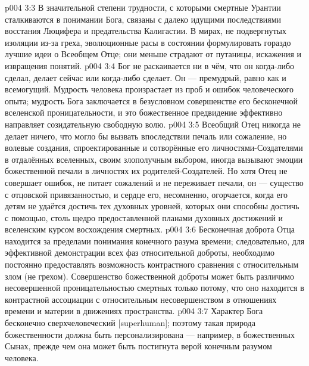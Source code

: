 \vs p004 3:3 \pc В значительной степени трудности, с которыми смертные Урантии сталкиваются в понимании Бога, связаны с далеко идущими последствиями восстания Люцифера и предательства Калигастии. В мирах, не подвергнутых изоляции из\hyp{}за греха, эволюционные расы в состоянии формулировать гораздо лучшие идеи о Всеобщем Отце; они меньше страдают от путаницы, искажения и извращения понятий.
\vs p004 3:4 \pc Бог не раскаивается ни в чём, что он когда\hyp{}либо сделал, делает сейчас или когда\hyp{}либо сделает. Он --- премудрый, равно как и всемогущий. Мудрость человека произрастает из проб и ошибок человеческого опыта; мудрость Бога заключается в безусловном совершенстве его бесконечной вселенской проницательности, и это божественное предвидение эффективно направляет созидательную свободную волю.
\vs p004 3:5 Всеобщий Отец никогда не делает ничего, что могло бы вызвать впоследствии печаль или сожаление, но волевые создания, спроектированные и сотворённые его личностями\hyp{}Создателями в отдалённых вселенных, своим злополучным выбором, иногда вызывают эмоции божественной печали в личностях их родителей\hyp{}Создателей. Но хотя Отец не совершает ошибок, не питает сожалений и не переживает печали, он --- существо с отцовской привязанностью, и сердце его, несомненно, огорчается, когда его детям не удаётся достичь тех духовных уровней, которых они способны достичь с помощью, столь щедро предоставленной планами духовных достижений и вселенским курсом восхождения смертных.
\vs p004 3:6 Бесконечная доброта Отца находится за пределами понимания конечного разума времени; следовательно, для эффективной демонстрации всех фаз относительной доброты, необходимо постоянно предоставлять возможность контрастного сравнения с относительным злом (не грехом). Совершенство божественной доброты может быть различимо несовершенной проницательностью смертных только потому, что оно находится в контрастной ассоциации с относительным несовершенством в отношениях времени и материи в движениях пространства.
\vs p004 3:7 Характер Бога бесконечно сверхчеловеческий [superhuman]; поэтому такая природа божественности должна быть персонализирована --- например, в божественных Сынах, прежде чем она может быть постигнута верой конечным разумом человека.
